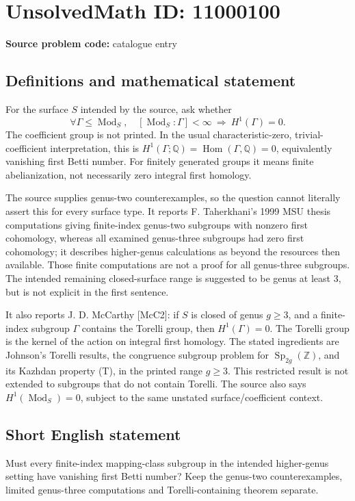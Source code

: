 \documentclass[11pt]{article}
\newcommand{\Z}{\mathbb{Z}}
\newcommand{\Q}{\mathbb{Q}}
\begin{document}
\section*{UnsolvedMath ID: 11000100}
\textbf{Source problem code:} catalogue entry
\subsection{Definitions and mathematical statement}
For the surface \(S\) intended by the source, ask whether
\[
 \forall\Gamma\leq\operatorname{Mod}_S,
 \quad[\operatorname{Mod}_S:\Gamma]<\infty
 \ \Longrightarrow\ H^1(\Gamma)=0.
\]
The coefficient group is not printed. In the usual characteristic-zero, trivial-coefficient interpretation, this is \(H^1(\Gamma;\Q)=\operatorname{Hom}(\Gamma,\Q)=0\), equivalently vanishing first Betti number. For finitely generated groups it means finite abelianization, not necessarily zero integral first homology.

The source supplies genus-two counterexamples, so the question cannot literally assert this for every surface type. It reports F. Taherkhani's 1999 MSU thesis computations giving finite-index genus-two subgroups with nonzero first cohomology, whereas all examined genus-three subgroups had zero first cohomology; it describes higher-genus calculations as beyond the resources then available. Those finite computations are not a proof for all genus-three subgroups. The intended remaining closed-surface range is suggested to be genus at least \(3\), but is not explicit in the first sentence.

It also reports J. D. McCarthy [McC2]: if \(S\) is closed of genus \(g\geq3\), and a finite-index subgroup \(\Gamma\) contains the Torelli group, then \(H^1(\Gamma)=0\). The Torelli group is the kernel of the action on integral first homology. The stated ingredients are Johnson's Torelli results, the congruence subgroup problem for \(\operatorname{Sp}_{2g}(\Z)\), and its Kazhdan property (T), in the printed range \(g\geq3\). This restricted result is not extended to subgroups that do not contain Torelli. The source also says \(H^1(\operatorname{Mod}_S)=0\), subject to the same unstated surface/coefficient context.
\subsection{Short English statement}
Must every finite-index mapping-class subgroup in the intended higher-genus setting have vanishing first Betti number? Keep the genus-two counterexamples, limited genus-three computations and Torelli-containing theorem separate.
\end{document}
